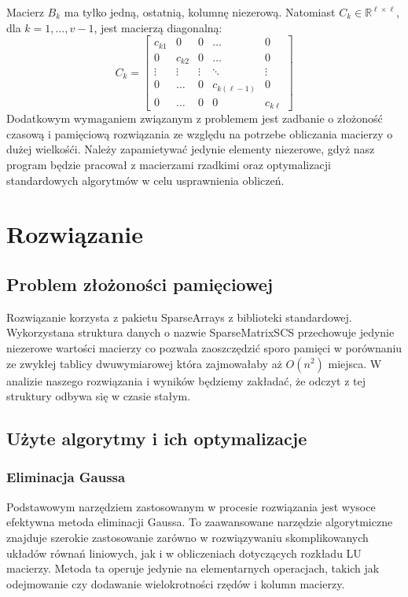 \documentclass{article}
\begin{document}
	Macierz $B_k$ ma tylko jedną, ostatnią, kolumnę niezerową. Natomiast $C_k \in \mathbb{R}^{\ell \times \ell}$, dla $k = 1, \ldots, v - 1$, jest macierzą diagonalną:\\
	\[
	C_k = \begin{bmatrix}
	    c_{k1} & 0 & 0 & \dots & 0 \\
	    0 & c_{k2} & 0 & \dots & 0 \\
	    \vdots & \vdots & \vdots & \ddots & \vdots \\
	    0 & \dots & 0 & c_{k(\ell-1)} & 0 \\
	    0 & \dots & 0 & 0 & c_{k\ell}
	\end{bmatrix}
	\]
	Dodatkowym wymaganiem związanym z problemem jest zadbanie o złożoność czasową i pamięciową rozwiązania ze względu na potrzebe obliczania macierzy o dużej wielkośći. Należy zapamietywać jedynie elementy niezerowe, gdyż nasz program będzie  pracował z macierzami rzadkimi oraz optymalizacji standardowych algorytmów w celu usprawnienia obliczeń.

\section*{Rozwiązanie}
\subsection*{Problem złożoności pamięciowej}
	Rozwiązanie korzysta z pakietu SparseArrays z biblioteki standardowej. Wykorzystana struktura danych o nazwie SparseMatrixSCS przechowuje jedynie niezerowe wartości macierzy co pozwala zaoszczędzić sporo pamięci w porównaniu ze zwykłej tablicy dwuwymiarowej która zajmowałaby aż $O(n^2)$ miejsca. W analizie naszego rozwiązania i wyników będziemy zakładać, że odczyt z tej struktury odbywa się w czasie stałym.

\subsection*{Użyte algorytmy i ich optymalizacje}
\subsubsection*{Eliminacja Gaussa}
	Podstawowym narzędziem zastosowanym w procesie rozwiązania jest wysoce efektywna metoda eliminacji Gaussa. To zaawansowane narzędzie algorytmiczne znajduje szerokie zastosowanie zarówno w rozwiązywaniu skomplikowanych układów równań liniowych, jak i w obliczeniach dotyczących rozkładu LU macierzy. Metoda ta operuje jedynie na elementarnych operacjach, takich jak odejmowanie czy dodawanie wielokrotności rzędów i kolumn macierzy.\\
\end{document}
